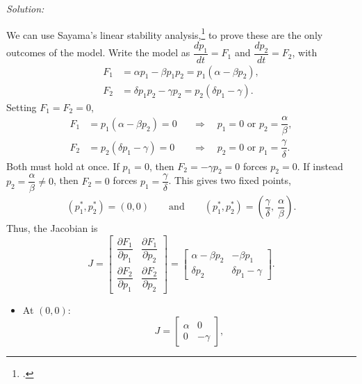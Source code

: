 \documentclass{article}
\newenvironment{solution}
    {\noindent \textit{Solution:}\vspace{1em}\\}
    {\newpage}
\newcommand{\Or}{\text{ or }}
\newcommand{\pl}{\left(}
\newcommand{\pr}{\right)}
\begin{document}
\begin{solution}
\begin{enumerate}
\begin{enumerate}
        We can use Sayama's linear stability
        analysis,\footcite{sayama2015} to prove these are the only outcomes of the model. Write the model as $\dfrac{dp_1}{dt} = F_1$ and $\dfrac{dp_2}{dt} = F_2$, with
        \begin{align*}
            F_1 &= \alpha p_1 - \beta p_1 p_2 = p_1 \pl \alpha - \beta p_2 \pr, \\
            F_2 &= \delta p_1 p_2 - \gamma p_2 = p_2 \pl \delta p_1 - \gamma \pr.
        \end{align*}
        Setting $F_1 = F_2 = 0$,
        \begin{align*}
            F_1 &= p_1 \pl \alpha - \beta p_2 \pr = 0 && \Rightarrow \quad p_1 = 0 \Or p_2 = \dfrac{\alpha}{\beta}, \\
            F_2 &= p_2 \pl \delta p_1 - \gamma \pr = 0 && \Rightarrow \quad p_2 = 0 \Or p_1 = \dfrac{\gamma}{\delta}.
        \end{align*}
        Both must hold at once. If $p_1 = 0$, then $F_2 = -\gamma p_2 = 0$ forces $p_2 = 0$. If instead
        $p_2 = \dfrac{\alpha}{\beta} \neq 0$, then $F_2 = 0$ forces $p_1 = \dfrac{\gamma}{\delta}$. This gives two fixed points,
        \begin{align*}
            \pl p_1^*, p_2^* \pr = \pl 0, 0 \pr \qquad \text{and} \qquad
            \pl p_1^*, p_2^* \pr = \pl \dfrac{\gamma}{\delta},\ \dfrac{\alpha}{\beta} \pr.
        \end{align*}
        Thus, the Jacobian is
        \begin{equation*}
            J = \begin{bmatrix}
                \dfrac{\partial F_1}{\partial p_1} & \dfrac{\partial F_1}{\partial p_2} \\[10pt]
                \dfrac{\partial F_2}{\partial p_1} & \dfrac{\partial F_2}{\partial p_2}
            \end{bmatrix}
            = \begin{bmatrix}
                \alpha - \beta p_2 & -\beta p_1 \\
                \delta p_2 & \delta p_1 - \gamma
            \end{bmatrix}.
        \end{equation*}
        \begin{itemize}
            \item At $\pl 0, 0 \pr$:
            \begin{equation*}
                J = \begin{bmatrix} \alpha & 0 \\ 0 & -\gamma \end{bmatrix},

\end{equation*}
\end{itemize}
\end{enumerate}
\end{enumerate}
\end{solution}
\end{document}
